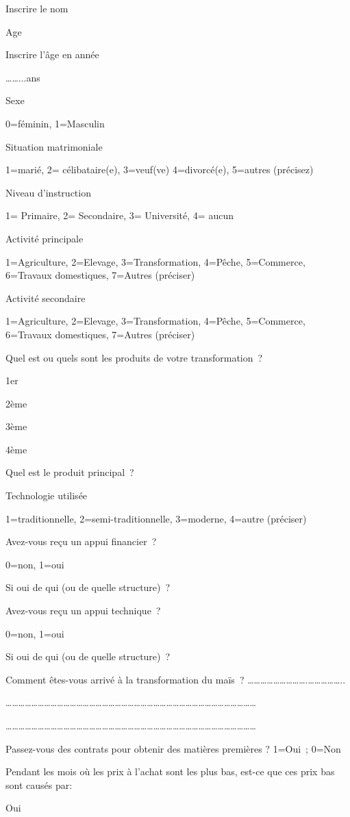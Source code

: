 \documentclass[12pt,oneside]{report}
\begin{document}
Inscrire le nom

Age

Inscrire l’âge en année

……...ans

Sexe

0=féminin, 1=Masculin

Situation matrimoniale

1=marié, 2= célibataire(e), 3=veuf(ve) 4=divorcé(e), 5=autres (précisez)

Niveau d’instruction

1= Primaire, 2= Secondaire, 3= Université, 4= aucun

Activité principale

1=Agriculture, 2=Elevage, 3=Transformation, 4=Pêche, 5=Commerce, 6=Travaux domestiques, 7=Autres (préciser)

Activité secondaire

1=Agriculture, 2=Elevage, 3=Transformation, 4=Pêche, 5=Commerce, 6=Travaux domestiques, 7=Autres (préciser)

Quel est ou quels sont les produits de votre transformation ?

1er

2ème

3ème

4ème

Quel est le produit principal ?

Technologie utilisée

1=traditionnelle, 2=semi-traditionnelle, 3=moderne, 4=autre (préciser)

Avez-vous reçu un appui financier ?

0=non, 1=oui

Si oui de qui (ou de quelle structure) ?

Avez-vous reçu un appui technique ?

0=non, 1=oui

Si oui de qui (ou de quelle structure) ?

Comment êtes-vous arrivé à la transformation du maïs ? ……………………….……………..

………………………………………………………………………………………………………

………………………………………………………………………………………………………

Passez-vous des contrats pour obtenir des matières premières ? 1=Oui ; 0=Non

Pendant les mois où les prix à l’achat sont les plus bas, est-ce que ces prix bas sont causés par:

Oui
\end{document}
